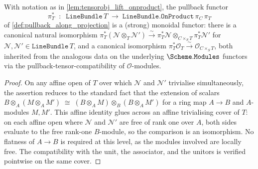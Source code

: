 \begin{lemma}
  \label{lem:pullback_compatible_with_tensorobj}
  With notation as in \cref{lem:tensorobj_lift_onproduct}, the pullback
  functor
  \[
    \pi_T^{*} \;\;\colon\;\; \texttt{LineBundle}\,T \;\longrightarrow\;
                          \texttt{LineBundle.OnProduct}\,\pi_C\,\pi_T
  \]
  of \cref{def:pullback_along_projection} is a (strong) monoidal
  functor: there is a canonical natural isomorphism
  \(\pi_T^*(\mathcal{N} \otimes_T \mathcal{N'})
     \xrightarrow{\sim}
   \pi_T^* \mathcal{N} \otimes_{C \times_S T} \pi_T^* \mathcal{N'}\)
  for \(\mathcal{N}, \mathcal{N'} \in \texttt{LineBundle}\,T\), and a
  canonical isomorphism
  \(\pi_T^* \mathcal{O}_T \xrightarrow{\sim} \mathcal{O}_{C \times_S T}\),
  both inherited from the analogous data on the underlying
  \(\Scheme.\mathtt{Modules}\) functors via the
  pullback-tensor-compatibility of \(\mathcal{O}\)-modules.
\end{lemma}

\begin{proof}
  On any affine open of \(T\) over which \(\mathcal{N}\) and
  \(\mathcal{N'}\) trivialise simultaneously, the assertion reduces to
  the standard fact that the extension of scalars
  \(B \otimes_A (M \otimes_A M')
   \;\cong\; (B \otimes_A M) \otimes_B (B \otimes_A M')\)
  for a ring map \(A \to B\) and \(A\)-modules \(M, M'\). This affine
  identity glues across an affine trivialising cover of \(T\): on each
  affine open where \(\mathcal{N}\) and \(\mathcal{N}'\) are free of rank one
  over \(A\), both sides evaluate to the free rank-one \(B\)-module, so
  the comparison is an isomorphism. No flatness of \(A \to B\) is required
  at this level, as the modules involved are locally free. The compatibility
  with the unit, the associator, and the unitors is verified pointwise on the
  same cover.
\end{proof}

